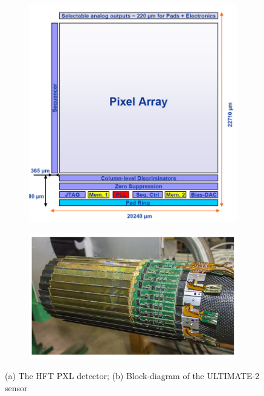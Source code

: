         \begin{figure}[h!]
            \begin{subfigure}{.4\textwidth}
            \centering
            \includegraphics[width=.98\linewidth]{figures/pixel_detectors_usage/MIMOSA.png}
            \end{subfigure}
            \begin{subfigure}{.6\textwidth}
                \centering
                \includegraphics[width=.98\linewidth]{figures/pixel_detectors_usage/STAR.png}
            \end{subfigure}
            \caption{(a) The HFT PXL detector; (b) Block-diagram of the ULTIMATE-2 sensor}
            \label{fig:}
        \end{figure}

